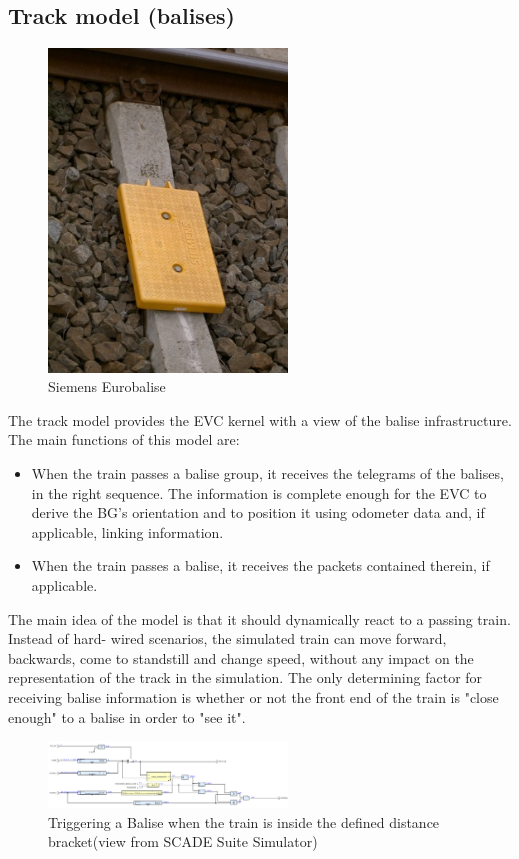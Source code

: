 \documentclass{template/openetcs_article}
\begin{document}
\subsection{Track model (balises)}

\begin{figure}[H]
  \centering
  \includegraphics[width=2.5in]{images/Eurobalise.jpg}
  \caption{Siemens Eurobalise}
  \label{fig:eurobalise}
\end{figure}

The track model provides the EVC kernel with a view of the balise infrastructure. The main functions of this model are:
\begin{itemize}
 \item When the train passes a balise group, it receives the telegrams of the balises, in the right sequence. The information is complete enough for the EVC to derive the BG's orientation and to position it using odometer data and, if applicable, linking information.
 \item When the train passes a balise, it receives the packets contained therein, if applicable. 
\end{itemize}

The main idea of the model is that it should dynamically react to a passing train. Instead of hard- wired scenarios, the simulated train can move forward, backwards, come to standstill and change speed, without any impact on the representation of the track in the simulation. The only determining factor for receiving balise information is whether or not the front end of the train is "close enough" to a balise in order to "see it".

\begin{figure}
  \centering
  \includegraphics[angle=90, origin=c,width=2.5in]{images/TrainPass}
  \caption{Triggering a Balise when the train is inside the defined distance bracket\newline (view from SCADE Suite Simulator)}
  \label{fig:balisepos}
\end{figure}
\end{document}
